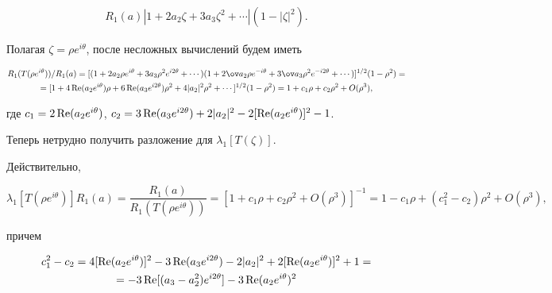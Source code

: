 \begin{pf}
\begin{multline*}
R_1(a)|1+2a_2\zeta+3a_3\zeta^2+\dotsb|(1-|\zeta|^2). 


\end{multline*} 


 


Полагая $\zeta=\rho e^{i\theta}$, после несложных вычислений будем иметь 


\begin{multline*} 


R_1(T(\rho e^{i\theta}))/R_1(a)=[(1+2a_2\rho e^{i\theta} 


+3a_3\rho^2 e^{i2\theta}+\dotsb)(1+2\ov a_2\rho e^{-i\theta}+ 


3\ov a_3\rho^2 e^{-i2\theta}+\dotsb)]^{1/2}(1-\rho^2)= \\ 


% 


=[1+4\re(a_2 e^{i\theta})\rho+6\re(a_3 e^{i2\theta})\rho^2+ 


4|a_2|^2\rho^2+\dotsb]^{1/2}(1-\rho^2)= 


1+c_1\rho+c_2\rho^2+O(\rho^3), 


\end{multline*} 


где $c_1=2\re(a_2e^{i\theta})$, $c_2=3\re(a_3 e^{i2\theta}) 


+2|a_2|^2-2[\re(a_2 e^{i\theta})]^2-1$. 


Теперь нетрудно получить разложение для $\lambda_1[T(\zeta)]$. 


Действительно, 


\begin{equation} 


\lambda_1[T(\rho e^{i\theta})]R_1(a)= 


\frac{R_1(a)}{R_1(T(\rho e^{i\theta}))}=[1+c_1\rho{+}c_2\rho^2{+} 


O(\rho^3)]^{-1}=1{-}c_1\rho{+}(c^2_1{-}c_2)\rho^2{+}O(\rho^3), 


\end{equation} 


причем 


\begin{multline*} 


c^2_1-c_2=4[\re(a_2e^{i\theta})]^2-3\re(a_3e^{i2\theta})- 


2|a_2|^2+2[\re(a_2e^{i\theta})]^2+1 = \\ 


% 


=-3\re[(a_3-a^2_2)e^{i2\theta}]-3\re(a_2e^{i\theta})^2 



\end{multline*}
\end{pf}
